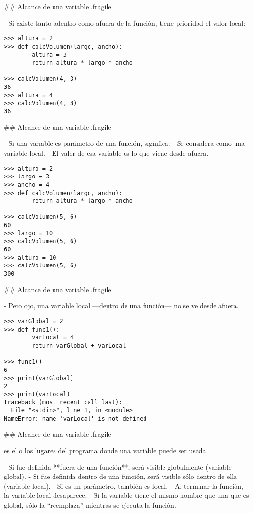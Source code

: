 ## Alcance de una variable {.fragile} 

- Si existe tanto adentro como afuera de la función, tiene prioridad el valor local:

\begin{lstlisting}[style=frame02,linebackgroundcolor={\btLstHL{1,3,8}}]
>>> altura = 2
>>> def calcVolumen(largo, ancho):
        altura = 3
        return altura * largo * ancho

>>> calcVolumen(4, 3)
36
>>> altura = 4
>>> calcVolumen(4, 3)
36
\end{lstlisting}

## Alcance de una variable {.fragile} 

- Si una variable es parámetro de una función, significa:
    - Se considera como una variable local.
    - El valor de esa variable es lo que viene desde afuera.

\begin{lstlisting}[style=frame02]
>>> altura = 2
>>> largo = 3
>>> ancho = 4
>>> def calcVolumen(largo, ancho):
        return altura * largo * ancho

>>> calcVolumen(5, 6)
60
>>> largo = 10
>>> calcVolumen(5, 6)
60
>>> altura = 10
>>> calcVolumen(5, 6)
300
\end{lstlisting}

## Alcance de una variable {.fragile} 

- Pero ojo, una variable local ---dentro de una función--- no se ve desde afuera.

\begin{lstlisting}[style=frame02]
>>> varGlobal = 2
>>> def func1():
        varLocal = 4
        return varGlobal + varLocal

>>> func1()
6
>>> print(varGlobal)
2
>>> print(varLocal)
Traceback (most recent call last):
  File "<stdin>", line 1, in <module>
NameError: name 'varLocal' is not defined
\end{lstlisting}


## Alcance de una variable {.fragile} 

\bgnblockdefinition
{} es el o los lugares del programa donde una variable puede ser usada.
\trmblockdefinition

\vfill


- Si fue definida **fuera de una función**, será visible globalmente (\textcolor{structure}{variable global}).
- Si fue definida dentro de una función, será visible sólo dentro de ella (\textcolor{structure}{variable local}).
    - Si es un parámetro, también es local.
    - Al terminar la función, la variable local desaparece.
    - Si la variable tiene el mismo nombre que una que es global, sólo
    la ``reemplaza'' mientras se ejecuta la función.

